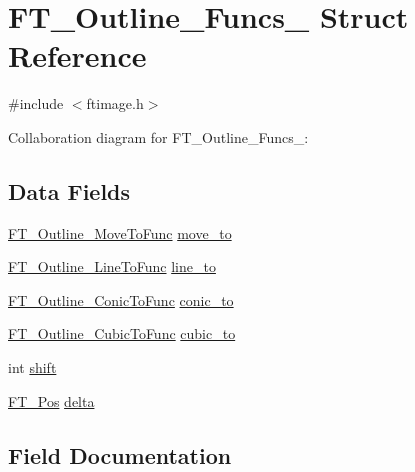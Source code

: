 \hypertarget{struct_f_t___outline___funcs__}{}\section{F\+T\+\_\+\+Outline\+\_\+\+Funcs\+\_\+ Struct Reference}
\label{struct_f_t___outline___funcs__}


{\ttfamily \#include $<$ftimage.\+h$>$}



Collaboration diagram for F\+T\+\_\+\+Outline\+\_\+\+Funcs\+\_\+\+:
\subsection*{Data Fields}
\begin{DoxyCompactItemize}
\item 
\hyperlink{ftimage_8h_adb1c27eedf361dcd3d331fa266a466af}{F\+T\+\_\+\+Outline\+\_\+\+Move\+To\+Func} \hyperlink{struct_f_t___outline___funcs___abd53463a59a1ae2c6998e619c2ab6a65}{move\+\_\+to}
\item 
\hyperlink{ftimage_8h_a522526513387d998682d59515fe93ccf}{F\+T\+\_\+\+Outline\+\_\+\+Line\+To\+Func} \hyperlink{struct_f_t___outline___funcs___a876fc8ca7541786cd3c4ec3806f88360}{line\+\_\+to}
\item 
\hyperlink{ftimage_8h_a44b83dd26e7f37eae86aee33ff3efd9b}{F\+T\+\_\+\+Outline\+\_\+\+Conic\+To\+Func} \hyperlink{struct_f_t___outline___funcs___a09681f5a64189066d3fba3cf398a135b}{conic\+\_\+to}
\item 
\hyperlink{ftimage_8h_a9c6f8d42a1660a57f55614baaa4b61b2}{F\+T\+\_\+\+Outline\+\_\+\+Cubic\+To\+Func} \hyperlink{struct_f_t___outline___funcs___aa3e0c1bacb181a5f43c104ab7f72cfda}{cubic\+\_\+to}
\item 
int \hyperlink{struct_f_t___outline___funcs___a540c246669b21b86cb405b3d9019cfda}{shift}
\item 
\hyperlink{ftimage_8h_af5f230f4b253d4c7715fd2e595614c90}{F\+T\+\_\+\+Pos} \hyperlink{struct_f_t___outline___funcs___a3c3121398b3ff564b4f3fd5b2a318e5e}{delta}
\end{DoxyCompactItemize}


\subsection{Field Documentation}
\mbox{\label{struct_f_t___outline___funcs___a09681f5a64189066d3fba3cf398a135b}} 

